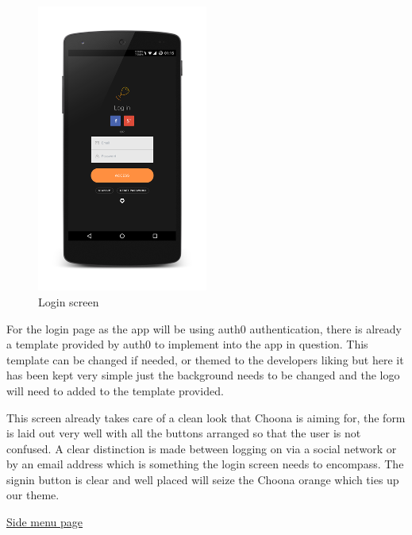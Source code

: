 \noindent
\begin{figure}[h!]
\centering
\includegraphics[width=0.5\textwidth]{./img/loginframed.png}
\caption{Login screen}
\label{fig:loginscreen}
\end{figure}

For the login page as the app will be using auth0 authentication, there is already a template provided by auth0 to implement into the app in question. This template can be changed if needed, or themed to the developers liking but here it has been kept very simple just the background needs to be changed and the logo will need to added to the template provided.

This screen already takes care of a clean look that Choona is aiming for, the form is laid out very well with all the buttons arranged so that the user is not confused. A clear distinction is made between logging on via a social network or by an email address which is something the login screen needs to encompass. The signin button is clear and well placed will seize the Choona orange which ties up our theme.\\

\newpage

\noindent\underline{Side menu page}\newline

